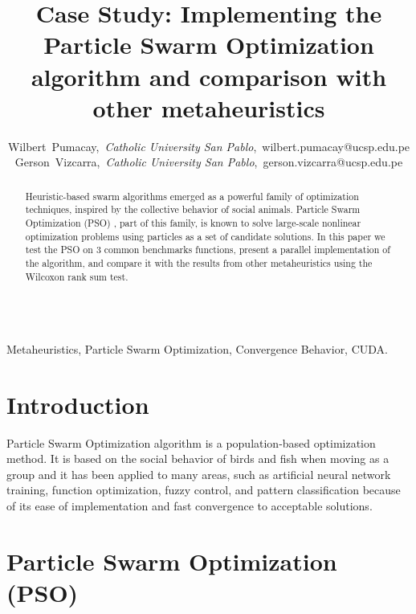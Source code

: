 \documentclass[journal,onecolumn]{IEEEtran}
\begin{document}
\title{Case Study: Implementing the Particle Swarm Optimization algorithm and comparison with other metaheuristics}

\author{Wilbert~Pumacay,~\textit{Catholic University San Pablo},~wilbert.pumacay@ucsp.edu.pe\\
        Gerson~Vizcarra,~\textit{Catholic University San Pablo},~gerson.vizcarra@ucsp.edu.pe}

\maketitle

\begin{abstract}
Heuristic-based swarm algorithms emerged as a powerful family of optimization techniques, inspired by the collective behavior of social animals. Particle Swarm Optimization (PSO) , part of this family, is known to solve large-scale nonlinear optimization problems using particles as a set of candidate solutions. In this paper we test the PSO on 3 common benchmarks functions, present a parallel implementation of the algorithm, and compare it with the results from other metaheuristics using the Wilcoxon rank sum test. 
\\
\\
\end{abstract}

\begin{IEEEkeywords}
Metaheuristics, Particle Swarm Optimization, Convergence Behavior, CUDA.
\end{IEEEkeywords}



\section{ \textbf{Introduction} }

 Particle Swarm Optimization algorithm is a population-based optimization method. It is based on the social behavior of birds and fish when moving as a group and it has been applied to many areas, such as artificial neural network training, function optimization, fuzzy control, and pattern classification because of its ease of implementation and fast convergence to acceptable solutions.

\section{ \textbf{Particle Swarm Optimization (PSO)} }
\end{document}
